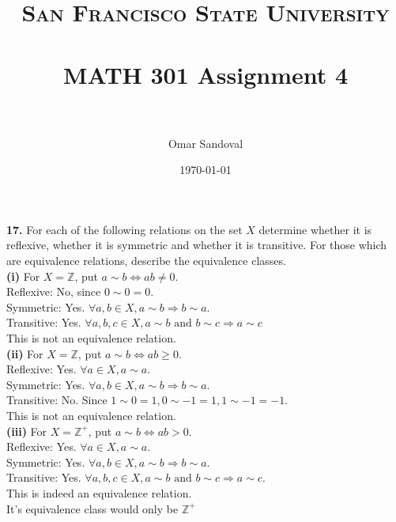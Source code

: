 \documentclass[paper=letter, fontsize=11pt]{scrartcl} %
\title{	
\normalfont \normalsize 
\textsc{San Francisco State University} \\ [25pt]
\horrule{0.5pt} \\[0.4cm] %
\huge MATH 301 Assignment 4  \\ %
\horrule{2pt} \\[0.5cm] %
}
\author{Omar Sandoval}
\date{\normalsize\today}
\begin{document}
\maketitle

\textbf{17.} For each of the following relations on the set $X$ determine whether it is
reflexive, whether it is symmetric and whether it is transitive. For those which are
equivalence relations, describe the equivalence classes. \\

\textbf{(i)} For $X = \mathbb{Z}$, put $a \sim b \Leftrightarrow a b \not=0$.
\\

Reflexive: No, since $0 \sim 0 = 0$. \\
Symmetric: Yes. $\forall a,b \in X, a \sim b \Rightarrow b \sim a$. \\
Transitive: Yes. $\forall a,b,c \in X, a \sim b \text{ and } b \sim c \Rightarrow a \sim c$ \\
This is not an equivalence relation. \\

\textbf{(ii)} For $X = \mathbb{Z}$, put $a \sim b \Leftrightarrow a b \ge 0$.
\\

Reflexive: Yes. $\forall a \in X, a \sim a$. \\
Symmetric: Yes. $\forall a,b \in X, a \sim b \Rightarrow b \sim a$. \\
Transitive: No. Since $1 \sim 0 = 1, 0 \sim -1 = 1, 1 \sim -1 = -1$. \\
This is not an equivalence relation. \\

\textbf{(iii)} For $X = \mathbb{Z}^+$, put $a \sim b \Leftrightarrow a b > 0$.
\\

Reflexive: Yes. $\forall a \in X, a \sim a$. \\
Symmetric: Yes. $\forall a,b \in X, a \sim b \Rightarrow b \sim a$. \\
Transitive: Yes. $\forall a,b,c \in X, a \sim b \text{ and } b \sim c \Rightarrow a \sim c$. \\
This is indeed an equivalence relation. \\ 
It's equivalence class would only be $\mathbb{Z}^+$
\\
\end{document}
